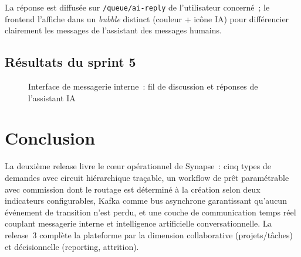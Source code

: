 La réponse est diffusée sur \texttt{/queue/ai-reply} de l'utilisateur concerné~;
le frontend l'affiche dans un \textit{bubble} distinct (couleur + icône IA)
pour différencier clairement les messages de l'assistant des messages humains.

\subsection{Résultats du sprint 5}

\begin{figure}[H]
  \centering
  \caption{Interface de messagerie interne~: fil de discussion et réponses de l'assistant IA}
  \label{fig:s5_chat}
\end{figure}

\section{Conclusion}

La deuxième release livre le c\oe{}ur opérationnel de Synapse~: cinq types de
demandes avec circuit hiérarchique traçable, un workflow de prêt paramétrable avec
commission dont le routage est déterminé à la création selon deux indicateurs
configurables, Kafka comme bus asynchrone garantissant qu'aucun événement de
transition n'est perdu, et une couche de communication temps réel couplant messagerie
interne et intelligence artificielle conversationnelle. La release~3 complète la
plateforme par la dimension collaborative (projets/tâches) et décisionnelle
(reporting, attrition).
